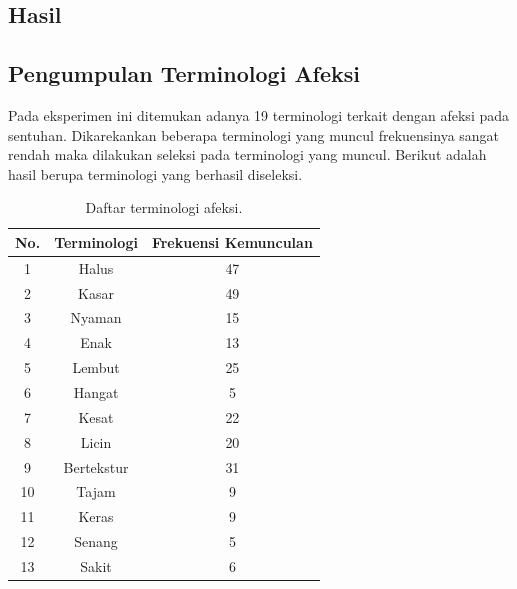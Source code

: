 \documentclass{Jurnal_kolo}
\begin{document}
\begin{multicols}{2}
	
	\section{Hasil}
	\subsection{Pengumpulan Terminologi Afeksi}
	\indent Pada eksperimen ini ditemukan adanya 19 terminologi terkait dengan afeksi pada sentuhan. Dikarekankan beberapa terminologi yang muncul frekuensinya sangat rendah maka dilakukan seleksi pada terminologi yang muncul. Berikut adalah hasil berupa terminologi yang berhasil diseleksi.
	
	\begin{table}[H]
		\centering
		\caption{\label{tab-termi}Daftar terminologi afeksi.}
		\begin{tabular}{|c|c|c|}
			\hline
			No. & Terminologi & Frekuensi Kemunculan\\
			\hline
			1 & Halus & 47\\
			\hline
			2 & Kasar & 49\\
			\hline
			3 & Nyaman & 15\\
			\hline
			4 & Enak & 13\\
			\hline
			5 & Lembut & 25\\
			\hline
			6 & Hangat & 5\\
			\hline
			7 & Kesat & 22 \\
			\hline
			8 & Licin & 20\\
			\hline
			9 & Bertekstur & 31\\
			\hline
			10 & Tajam & 9 \\
			\hline
			11 & Keras & 9 \\
			\hline
			12 & Senang & 5\\
			\hline
			13 & Sakit & 6\\
			\hline
		\end{tabular}
	\end{table}
	

\end{multicols}
\end{document}
